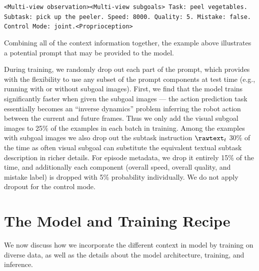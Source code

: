 

\begin{tcolorbox}
\footnotesize
\texttt{<Multi-view observation><Multi-view subgoals> Task: peel vegetables. Subtask: pick up the peeler. Speed: 8000. Quality: 5. Mistake: false. Control Mode: joint.<Proprioception> }
\end{tcolorbox}
Combining all of the context information together, the example above illustrates a potential prompt that may be provided to the model.

During training, we randomly drop out each part of the prompt, which provides \MethodName{} with the flexibility to use any subset of the prompt components at test time (e.g., running with or without subgoal images).
First, we find that the model trains significantly faster when given the subgoal images --- the action prediction task essentially becomes an ``inverse dynamics'' problem inferring the robot action between the current and future frames. Thus we only add the visual subgoal images to 25\% of the examples in each batch in training. Among the examples with subgoal images we also drop out the subtask instruction $\rawtext_t$ 30\% of the time as often visual subgoal can substitute the equivalent textual subtask description in richer details. For episode metadata, we drop it entirely 15\% of the time, and additionally each component (overall speed, overall quality, and mistake label) is dropped with 5\% probability individually. We do not apply dropout for the control mode.

\section{The \texorpdfstring{\ModelSymbol{}}{pi0.7} Model and Training Recipe}
\label{sec:method}


We now discuss how we incorporate the different context in \ModelSymbol{} model by training on diverse data, as well as the details about the model architecture, training, and inference.


